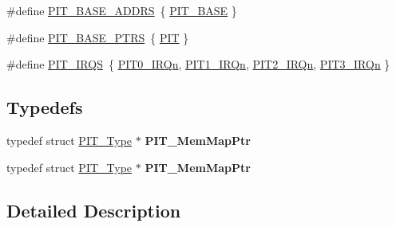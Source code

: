 \begin{DoxyCompactItemize}
\item 
\#define \hyperlink{group__PIT__Peripheral__Access__Layer_ga79085fa95893e4423661373b7be2f0a7}{P\+I\+T\+\_\+\+B\+A\+S\+E\+\_\+\+A\+D\+D\+RS}~\{ \hyperlink{group__PIT__Peripheral__Access__Layer_gaf00b86ba33a2cfe7bb100b4f01905f41}{P\+I\+T\+\_\+\+B\+A\+SE} \}
\item 
\#define \hyperlink{group__PIT__Peripheral__Access__Layer_ga403e0ed71b80cfe3e085fe6b56b5eff0}{P\+I\+T\+\_\+\+B\+A\+S\+E\+\_\+\+P\+T\+RS}~\{ \hyperlink{group__PIT__Peripheral__Access__Layer_gaf181c9e6602b6432a0bf1a9243808968}{P\+IT} \}
\item 
\#define \hyperlink{group__PIT__Peripheral__Access__Layer_ga5f0ae6317a2c8c12e46e49c6e2e29dda}{P\+I\+T\+\_\+\+I\+R\+QS}~\{ \hyperlink{group__Interrupt__vector__numbers_gga666eb0caeb12ec0e281415592ae89083ab3bc681f165a0965ac922a33bcc466c3}{P\+I\+T0\+\_\+\+I\+R\+Qn}, \hyperlink{group__Interrupt__vector__numbers_gga666eb0caeb12ec0e281415592ae89083aebde56c1a0c87a74c43fc8b35309d429}{P\+I\+T1\+\_\+\+I\+R\+Qn}, \hyperlink{group__Interrupt__vector__numbers_gga666eb0caeb12ec0e281415592ae89083afdef24d623050c63c2c35eb54dd35caf}{P\+I\+T2\+\_\+\+I\+R\+Qn}, \hyperlink{group__Interrupt__vector__numbers_gga666eb0caeb12ec0e281415592ae89083aa6195cc174d28b297fe7652bf1663311}{P\+I\+T3\+\_\+\+I\+R\+Qn} \}
\end{DoxyCompactItemize}
\subsection*{Typedefs}
\begin{DoxyCompactItemize}
\item 
typedef struct \hyperlink{structPIT__Type}{P\+I\+T\+\_\+\+Type} $\ast$ {\bfseries P\+I\+T\+\_\+\+Mem\+Map\+Ptr}\hypertarget{group__PIT__Peripheral__Access__Layer_ga943956eb132093c3796f47dd95bebd1d}{}\label{group__PIT__Peripheral__Access__Layer_ga943956eb132093c3796f47dd95bebd1d}

\item 
typedef struct \hyperlink{structPIT__Type}{P\+I\+T\+\_\+\+Type} $\ast$ {\bfseries P\+I\+T\+\_\+\+Mem\+Map\+Ptr}\hypertarget{group__PIT__Peripheral__Access__Layer_ga943956eb132093c3796f47dd95bebd1d}{}\label{group__PIT__Peripheral__Access__Layer_ga943956eb132093c3796f47dd95bebd1d}

\end{DoxyCompactItemize}


\subsection{Detailed Description}


